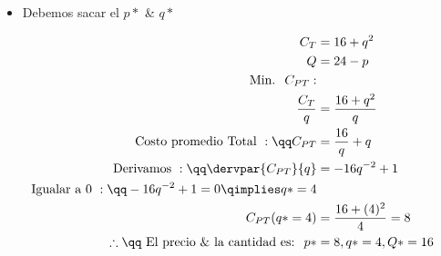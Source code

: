 \begin{itemize}
\begin{center}
\begin{figure}[!htb]
            \end{figure}
        \end{center}
        \begin{itemize}                
        \item Debemos sacar el $p*$ \& $q*$ 
        \end{itemize}
        \begin{center}
           \begin{align*}
               C_T &= 16 + q^2 \\ 
               Q &= 24 - p \\ 
               \text{ Min.  }\; C_{PT}: \\ 
                    \frac{C_T}{q} &= \frac{16+q^2}{q} \\ 
                    \text{ Costo promedio Total }: \qq C_{PT} &= \frac{16}{q} + q \\ 
                    \text{ Derivamos }: \qq   
                        \dervpar{C_{PT}}{q} &= -16q^{-2} + 1 \\  
                        \text{ Igualar a 0 }: \qq  -16q^{-2} + 1 = 0 \qimplies q* = 4 \\ 
                C_{PT}(q*=4) &= \frac{16+(4)^2}{4} = 8 \\  
                \therefore \qq \text{ El precio \&  la cantidad es:  }\; p*&=8, q*=4, Q*=16 \\ 
           \end{align*}
        \end{center}
    

\end{itemize}
